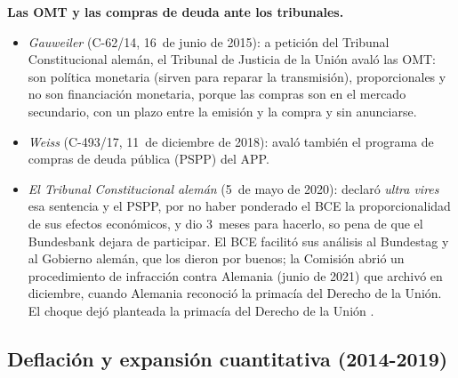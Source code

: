 \documentclass[11pt]{article}
\begin{document}
\begin{anotaciones}
\textbf{Las OMT y las compras de deuda ante los tribunales.}
\begin{itemize}
\item \emph{Gauweiler} (C-62/14, 16~de junio de 2015): a petición del Tribunal Constitucional alemán, el Tribunal de Justicia de la Unión avaló las OMT: son política monetaria (sirven para reparar la transmisión), proporcionales y no son financiación monetaria, porque las compras son en el mercado secundario, con un plazo entre la emisión y la compra y sin anunciarse\nocite{TJUE2015Gauweiler}.
\item \emph{Weiss} (C-493/17, 11~de diciembre de 2018): avaló también el programa de compras de deuda pública (PSPP) del APP\nocite{TJUE2018Weiss}.
\item \emph{El Tribunal Constitucional alemán} (5~de mayo de 2020): declaró \emph{ultra vires} esa sentencia y el PSPP, por no haber ponderado el BCE la proporcionalidad de sus efectos económicos, y dio 3~meses para hacerlo, so pena de que el Bundesbank dejara de participar\nocite{BVerfG2020PSPP}. El BCE facilitó sus análisis al Bundestag y al Gobierno alemán, que los dieron por buenos; la Comisión abrió un procedimiento de infracción contra Alemania (junio de 2021) que archivó en diciembre, cuando Alemania reconoció la primacía del Derecho de la Unión\nocite{CE2021InfraccionAlemania,CE2021InfraccionArchivo}. El choque dejó planteada la primacía del Derecho de la Unión .
\end{itemize}
\end{anotaciones}

\subsection{Deflación y expansión cuantitativa (2014-2019)}\label{sec:qe}
\end{document}

